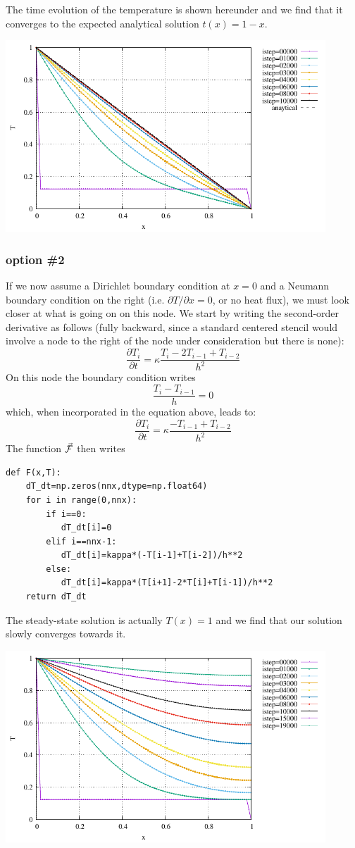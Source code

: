 The time evolution of the temperature is shown hereunder and we find that 
it converges to the expected analytical solution $t(x)=1-x$.

\begin{center}
\includegraphics[width=12cm]{python_codes/fieldstone_157/results/option1/T.pdf}
\end{center}

\subsubsection*{option \#2}

If we now assume a Dirichlet boundary condition at $x=0$ and a Neumann boundary condition 
on the right (i.e. $\partial T/\partial x=0$, or no heat flux), we must look closer at what is going on 
on this node. 
We start by writing the second-order derivative as follows (fully backward, since
a standard centered stencil would involve a node to the right of the node 
under consideration but there is none):
\[
\frac{\partial T_i}{\partial t} = \kappa \frac{T_{i}-2T_{i-1}+T_{i-2}}{h^2}
\]
On this node the boundary condition writes
\[
\frac{T_i-T_{i-1}}{h}=0
\]
which, when incorporated in the equation above, leads to:
\[
\frac{\partial T_i}{\partial t} = \kappa \frac{-T_{i-1}+T_{i-2}}{h^2}
\]
The function $\vec{\cal F}$ then writes
\begin{lstlisting}
def F(x,T):
    dT_dt=np.zeros(nnx,dtype=np.float64)
    for i in range(0,nnx):
        if i==0:
           dT_dt[i]=0
        elif i==nnx-1: 
           dT_dt[i]=kappa*(-T[i-1]+T[i-2])/h**2
        else:
           dT_dt[i]=kappa*(T[i+1]-2*T[i]+T[i-1])/h**2
    return dT_dt
\end{lstlisting}

The steady-state solution is actually $T(x)=1$ and we find that our solution slowly converges towards it.
\begin{center}
\includegraphics[width=12cm]{python_codes/fieldstone_157/results/option2/T.pdf}
\end{center}






 
